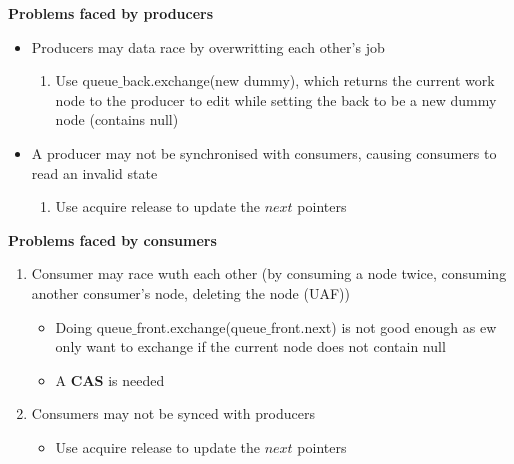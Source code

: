 \documentclass[10pt, landscape]{article}
\begin{document}
\begin{multicols}{4}
\textbf{Problems faced by producers} \\
\begin{itemize}
    \item  Producers may data race by overwritting each other's job
    \begin{enumerate}
        \item Use queue$\_$back.exchange(new dummy), which returns the current work node to the producer to edit while setting the back to be a new dummy node (contains null)
    \end{enumerate}
    \item A producer may not be synchronised with consumers, causing consumers to read an invalid state
    \begin{enumerate}
        \item Use acquire release to update the $next$ pointers 
    \end{enumerate}
\end{itemize}

\textbf{Problems faced by consumers} \\
\begin{enumerate}
    \item Consumer may race wuth each other (by consuming a node twice, consuming another consumer's node, deleting the node (UAF))
    \begin{itemize}
        \item Doing queue$\_$front.exchange(queue$\_$front.next) is not good enough as ew only want to exchange if the current node does not contain null 
        \item A \textbf{CAS} is needed
    \end{itemize}
    \item Consumers may not be synced with producers 
    \begin{itemize}
        \item Use acquire release to update the $next$ pointers
    \end{itemize}
\end{enumerate}


\end{multicols}
\end{document}

